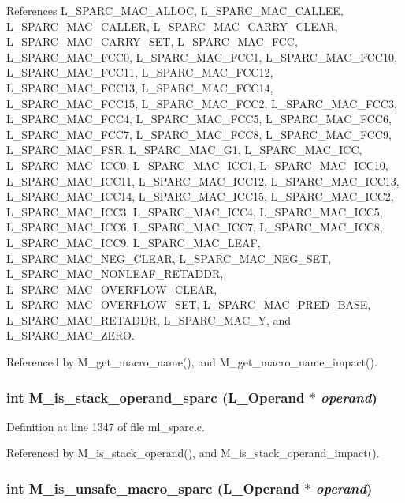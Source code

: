 References L\_\-SPARC\_\-MAC\_\-ALLOC, L\_\-SPARC\_\-MAC\_\-CALLEE, L\_\-SPARC\_\-MAC\_\-CALLER, L\_\-SPARC\_\-MAC\_\-CARRY\_\-CLEAR, L\_\-SPARC\_\-MAC\_\-CARRY\_\-SET, L\_\-SPARC\_\-MAC\_\-FCC, L\_\-SPARC\_\-MAC\_\-FCC0, L\_\-SPARC\_\-MAC\_\-FCC1, L\_\-SPARC\_\-MAC\_\-FCC10, L\_\-SPARC\_\-MAC\_\-FCC11, L\_\-SPARC\_\-MAC\_\-FCC12, L\_\-SPARC\_\-MAC\_\-FCC13, L\_\-SPARC\_\-MAC\_\-FCC14, L\_\-SPARC\_\-MAC\_\-FCC15, L\_\-SPARC\_\-MAC\_\-FCC2, L\_\-SPARC\_\-MAC\_\-FCC3, L\_\-SPARC\_\-MAC\_\-FCC4, L\_\-SPARC\_\-MAC\_\-FCC5, L\_\-SPARC\_\-MAC\_\-FCC6, L\_\-SPARC\_\-MAC\_\-FCC7, L\_\-SPARC\_\-MAC\_\-FCC8, L\_\-SPARC\_\-MAC\_\-FCC9, L\_\-SPARC\_\-MAC\_\-FSR, L\_\-SPARC\_\-MAC\_\-G1, L\_\-SPARC\_\-MAC\_\-ICC, L\_\-SPARC\_\-MAC\_\-ICC0, L\_\-SPARC\_\-MAC\_\-ICC1, L\_\-SPARC\_\-MAC\_\-ICC10, L\_\-SPARC\_\-MAC\_\-ICC11, L\_\-SPARC\_\-MAC\_\-ICC12, L\_\-SPARC\_\-MAC\_\-ICC13, L\_\-SPARC\_\-MAC\_\-ICC14, L\_\-SPARC\_\-MAC\_\-ICC15, L\_\-SPARC\_\-MAC\_\-ICC2, L\_\-SPARC\_\-MAC\_\-ICC3, L\_\-SPARC\_\-MAC\_\-ICC4, L\_\-SPARC\_\-MAC\_\-ICC5, L\_\-SPARC\_\-MAC\_\-ICC6, L\_\-SPARC\_\-MAC\_\-ICC7, L\_\-SPARC\_\-MAC\_\-ICC8, L\_\-SPARC\_\-MAC\_\-ICC9, L\_\-SPARC\_\-MAC\_\-LEAF, L\_\-SPARC\_\-MAC\_\-NEG\_\-CLEAR, L\_\-SPARC\_\-MAC\_\-NEG\_\-SET, L\_\-SPARC\_\-MAC\_\-NONLEAF\_\-RETADDR, L\_\-SPARC\_\-MAC\_\-OVERFLOW\_\-CLEAR, L\_\-SPARC\_\-MAC\_\-OVERFLOW\_\-SET, L\_\-SPARC\_\-MAC\_\-PRED\_\-BASE, L\_\-SPARC\_\-MAC\_\-RETADDR, L\_\-SPARC\_\-MAC\_\-Y, and L\_\-SPARC\_\-MAC\_\-ZERO.

Referenced by M\_\-get\_\-macro\_\-name(), and M\_\-get\_\-macro\_\-name\_\-impact().
\subsubsection{\setlength{\rightskip}{0pt plus 5cm}int M\_\-is\_\-stack\_\-operand\_\-sparc (L\_\-Operand $\ast$ {\em operand})}\label{m__sparc_8h_08fa05cb5089960cd58a7de1f11ecdda}




Definition at line 1347 of file ml\_\-sparc.c.

Referenced by M\_\-is\_\-stack\_\-operand(), and M\_\-is\_\-stack\_\-operand\_\-impact().
\subsubsection{\setlength{\rightskip}{0pt plus 5cm}int M\_\-is\_\-unsafe\_\-macro\_\-sparc (L\_\-Operand $\ast$ {\em operand})}\label{m__sparc_8h_b2f244b133c5cd2674cce2f51cd48875}





